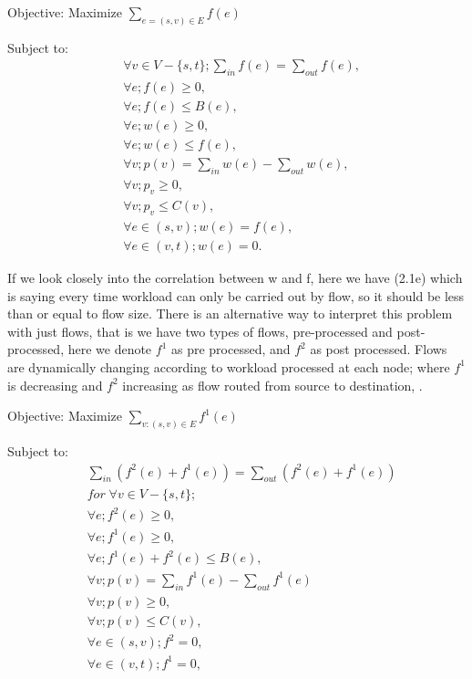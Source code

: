 \documentclass[twoside,leqno, 11pt]{article}
\begin{document}
Objective: Maximize $\sum \limits_{e=(s, v) \in E} f(e) $

Subject to:
\begin{subequations}
\begin{align}
&\forall v \in V-\{s, t\}; \sum\limits_{in}  f(e)= \sum\limits_{out} f(e),\\
&\forall e; f(e)\geq 0,\\
&\forall e; f(e)\leq B(e),\\
&\forall e; w(e) \geq 0,\\
&\forall e; w(e) \leq f(e),\\
&\forall v; p(v) = \sum\limits_{in } w(e) - \sum\limits_{out} w(e),\\
&\forall v; p_v\geq 0 ,\\
&\forall v; p_v\leq C(v),\\
&\forall e\in(s, v) ; w(e) =f(e),\\
&\forall e\in(v,t) ; w(e) =0.
\end{align}
\end{subequations}
  
If we look closely into the correlation between w and f, here we have (2.1e) which is saying every time workload can only be carried out by flow, so it should be less than or equal to flow size. There is an alternative way to interpret this problem with just flows, that is we have two types of flows, pre-processed and post-processed, here we denote $f^1$ as pre processed, and $f^2$ as post processed. Flows are dynamically changing according to workload processed at each node; where $f^1$ is decreasing and $f^2$ increasing as flow routed from source to destination, . 

Objective: Maximize $\sum \limits_{v: (s, v) \in E} f^1(e) $ 

Subject to:
\begin{subequations}
\begin{align}
&\sum\limits_{in} ( f^2(e)+ f^1(e))= \sum\limits_{out } ( f^2(e)+ f^1(e))\\
&for\; \forall v \in V-\{s, t\}; \nonumber\\
&\forall e; f^2(e)\geq 0,\\
&\forall e; f^1(e)\geq 0,\\
&\forall e; f^1(e)+ f^2(e)\leq B(e),\\
&\forall v; p(v) = \sum\limits_{in } f^1(e) - \sum\limits_{out} f^1(e) \\
&\forall v;p(v)\geq 0, \\
&\forall v;p(v)\leq C(v),\\
&\forall e\in (s,v); f^2=0, \\
&\forall e\in (v,t); f^1=0,
\end{align}
\end{subequations}
\end{document}
